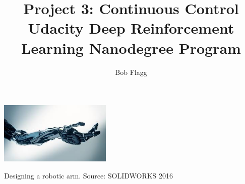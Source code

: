 \documentclass[sigchi]{acmart}
\begin{document}
%
\title{    
	Project 3: Continuous Control\\
	{\large Udacity Deep Reinforcement Learning Nanodegree Program}
}

%
\author{Bob Flagg}\affiliation{}

%
\renewcommand{\shortauthors}{Bob Flagg}

%

%
%

%
\begin{teaserfigure}
	\centering
  \includegraphics[width=0.4\textwidth]{arm}
  \caption{Designing a robotic arm. Source: SOLIDWORKS 2016}
  \label{fig:teaser}
\end{teaserfigure}

%
\maketitle

\end{document}
